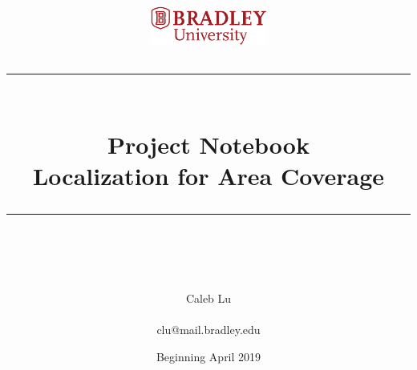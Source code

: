 \documentclass[fontsize=11pt, %
                             paper=letter, %
                             twoside, %
                             captions=tableheading,
                             index=totoc,
                             hyperref]{labbook}
\newcommand{\HRule}{\rule{\linewidth}{0.5mm}} %
\begin{document}


%

\title{
\begin{center}
\href{http://www.bradley.edu}{\includegraphics[height=0.5in]{figs/logoBU1-Print}}
\vskip10pt
\HRule \\[0.4cm]
{\Huge \bfseries Project Notebook \\[0.5cm] \Large Localization for Area Coverage}\\[0.4cm] %
\HRule \\[1.5cm]
\end{center}
}
\author{\Huge Caleb Lu \\ \\ \LARGE clu@mail.bradley.edu \\[2cm]} %
\date{Beginning April 2019} %
\maketitle


\printindex
\tableofcontents %
\newpage %
\end{document}
